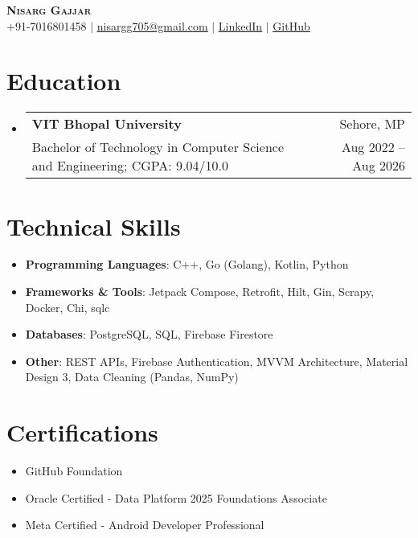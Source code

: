 \documentclass[letterpaper,11pt]{article}
\makeatletter
\newcommand{\resumeItem}[1]{
  \item\small{#1 \vspace{-2pt}}
}
\newcommand{\resumeSubheading}[4]{
  \vspace{-1pt}\item
    \begin{tabular*}{0.97\textwidth}[t]{l@{\extracolsep{\fill}}r}
      \textbf{#1} & #2 \\
      \small#3 & \small#4 \\
    \end{tabular*}\vspace{-7pt}
}
\newcommand{\resumeSubHeadingListStart}{\begin{itemize}[leftmargin=0.15in, label={}]}
\newcommand{\resumeSubHeadingListEnd}{\end{itemize}}
\newcommand{\resumeItemListStart}{\begin{itemize}}
\newcommand{\resumeItemListEnd}{\end{itemize}\vspace{-5pt}}
\makeatother
\begin{document}
\begin{center}
    \textbf{\Huge \scshape Nisarg Gajjar} \\ \vspace{1pt}
    \small +91-7016801458 $|$ \href{mailto:nisargg705@gmail.com}{\underline{nisargg705@gmail.com}} $|$
    \href{https://www.linkedin.com/in/nisargg705/}{\underline{LinkedIn}} $|$
    \href{https://github.com/Nisrgg}{\underline{GitHub}}
\end{center}

\section{Education}
  \resumeSubHeadingListStart
    \resumeSubheading
      {VIT Bhopal University}{Sehore, MP}
      {Bachelor of Technology in Computer Science and Engineering; CGPA: 9.04/10.0}
      {Aug 2022 – Aug 2026}
  \resumeSubHeadingListEnd

\section{Technical Skills}
\resumeItemListStart
  \resumeItem{\textbf{Programming Languages}: C++, Go (Golang), Kotlin, Python}
  \resumeItem{\textbf{Frameworks \& Tools}: Jetpack Compose, Retrofit, Hilt, Gin, Scrapy, Docker, Chi, sqlc}
  \resumeItem{\textbf{Databases}: PostgreSQL, SQL, Firebase Firestore}
  \resumeItem{\textbf{Other}: REST APIs, Firebase Authentication, MVVM Architecture, Material Design 3, Data Cleaning (Pandas, NumPy)}
\resumeItemListEnd

\section{Certifications}
\resumeItemListStart
  \resumeItem{GitHub Foundation}
  \resumeItem{Oracle Certified - Data Platform 2025 Foundations Associate}
  \resumeItem{Meta Certified - Android Developer Professional}
\resumeItemListEnd



\end{document}

